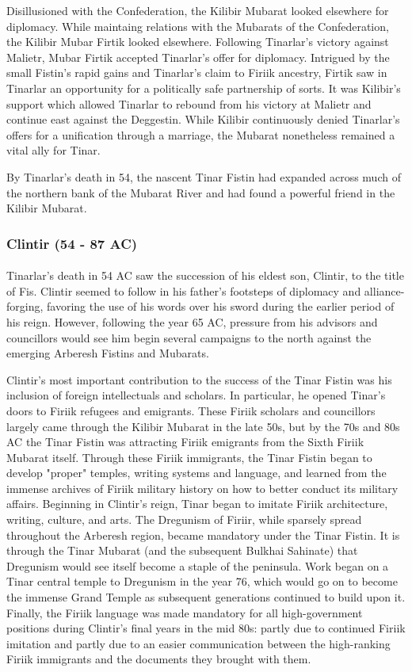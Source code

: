 Disillusioned with the Confederation, the Kilibir Mubarat looked elsewhere for diplomacy. While maintaing relations with the Mubarats of the Confederation, the Kilibir Mubar Firtik looked elsewhere. Following Tinarlar's victory against Malietr, Mubar Firtik accepted Tinarlar's offer for diplomacy. Intrigued by the small Fistin's rapid gains and Tinarlar's claim to Firiik ancestry, Firtik saw in Tinarlar an opportunity for a politically safe partnership of sorts. It was Kilibir's support which allowed Tinarlar to rebound from his victory at Malietr and continue east against the Deggestin. While Kilibir continuously denied Tinarlar's offers for a unification through a marriage, the Mubarat nonetheless remained a vital ally for Tinar.

By Tinarlar's death in 54, the nascent Tinar Fistin had expanded across much of the northern bank of the Mubarat River and had found a powerful friend in the Kilibir Mubarat.
\subsubsection{Clintir (54 - 87 AC)}
\paragraph{}
Tinarlar's death in 54 AC saw the succession of his eldest son, Clintir, to the title of Fis. Clintir seemed to follow in his father's footsteps of diplomacy and alliance-forging, favoring the use of his words over his sword during the earlier period of his reign. However, following the year 65 AC, pressure from his advisors and councillors would see him begin several campaigns to the north against the emerging Arberesh Fistins and Mubarats.

Clintir's most important contribution to the success of the Tinar Fistin was his inclusion of foreign intellectuals and scholars. In particular, he opened Tinar's doors to Firiik refugees and emigrants. These Firiik scholars and councillors largely came through the Kilibir Mubarat in the late 50s, but by the 70s and 80s AC the Tinar Fistin was attracting Firiik emigrants from the Sixth Firiik Mubarat itself. Through these Firiik immigrants, the Tinar Fistin began to develop "proper" temples, writing systems and language, and learned from the immense archives of Firiik military history on how to better conduct its military affairs. Beginning in Clintir's reign, Tinar began to imitate Firiik architecture, writing, culture, and arts. The Dregunism of Firiir, while sparsely spread throughout the Arberesh region, became mandatory under the Tinar Fistin. It is through the Tinar Mubarat (and the subsequent Bulkhai Sahinate) that Dregunism would see itself become a staple of the peninsula. Work began on a Tinar central temple to Dregunism in the year 76, which would go on to become the immense Grand Temple as subsequent generations continued to build upon it. Finally, the Firiik language was made mandatory for all high-government positions during Clintir's final years in the mid 80s: partly due to continued Firiik imitation and partly due to an easier communication between the high-ranking Firiik immigrants and the documents they brought with them.

